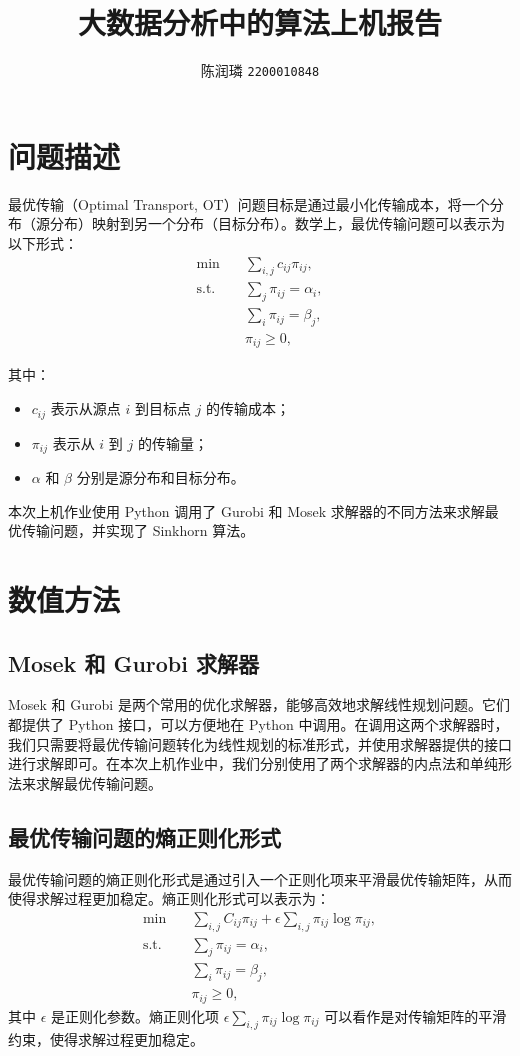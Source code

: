 \documentclass{article}
\title{大数据分析中的算法上机报告}
\author{陈润璘 \texttt{2200010848}}
\begin{document}
\maketitle

\section{问题描述}
最优传输（Optimal Transport, OT）问题目标是通过最小化传输成本，将一个分布（源分布）映射到另一个分布（目标分布）。数学上，最优传输问题可以表示为以下形式：
\begin{align}
    \min \quad &\sum_{i,j} c_{ij} \pi_{ij},\\
    \text{s.t.} \quad &\sum_j \pi_{ij} = \alpha_i,\\
    & \sum_i \pi_{ij} = \beta_j,\\
    & \pi_{ij} \geq 0,
\end{align}

其中：
\begin{itemize}
    \item $c_{ij}$ 表示从源点 $i$ 到目标点 $j$ 的传输成本；
    \item $\pi_{ij}$ 表示从 $i$ 到 $j$ 的传输量；
    \item $\alpha$ 和 $\beta$ 分别是源分布和目标分布。
\end{itemize}
本次上机作业使用 Python 调用了 Gurobi 和 Mosek 求解器的不同方法来求解最优传输问题，并实现了 Sinkhorn 算法。

\section{数值方法}

\subsection{Mosek 和 Gurobi 求解器}
Mosek 和 Gurobi 是两个常用的优化求解器，能够高效地求解线性规划问题。它们都提供了 Python 接口，可以方便地在 Python 中调用。在调用这两个求解器时，我们只需要将最优传输问题转化为线性规划的标准形式，并使用求解器提供的接口进行求解即可。在本次上机作业中，我们分别使用了两个求解器的内点法和单纯形法来求解最优传输问题。

\subsection{最优传输问题的熵正则化形式}
最优传输问题的熵正则化形式是通过引入一个正则化项来平滑最优传输矩阵，从而使得求解过程更加稳定。熵正则化形式可以表示为：
\begin{align}
    \min \quad &\sum_{i,j} C_{ij} \pi_{ij} + \epsilon \sum_{i,j} \pi_{ij} \log \pi_{ij},\\
    \text{s.t.} \quad &\sum_j \pi_{ij} = \alpha_i,\\
    & \sum_i \pi_{ij} = \beta_j,\\
    & \pi_{ij} \geq 0,
\end{align}
其中 $\epsilon$ 是正则化参数。熵正则化项 $\epsilon \sum_{i,j} \pi_{ij} \log \pi_{ij}$ 可以看作是对传输矩阵的平滑约束，使得求解过程更加稳定。
\end{document}
